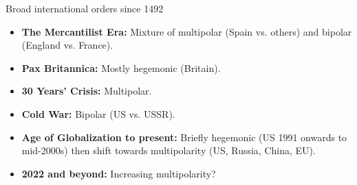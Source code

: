 \documentclass{beamer}
\begin{document}
\begin{frame}{\LARGE Broad international orders since 1492}
	\begin{itemize}
		\item \textbf{The Mercantilist Era:} \pause Mixture of multipolar (Spain vs. others) and bipolar (England vs. France). \pause
		\item \textbf{Pax Britannica:} \pause Mostly hegemonic (Britain). \pause
		\item \textbf{30 Years' Crisis:} \pause Multipolar.
		\item \textbf{Cold War:} \pause Bipolar (US vs. USSR). \pause
		\item \textbf{Age of Globalization to present:} \pause Briefly hegemonic (US 1991 onwards to mid-2000s) then shift towards multipolarity (US, Russia, China, EU).
		\item \textbf{2022 and beyond:} \pause Increasing multipolarity? 
	\end{itemize}
\end{frame}
\end{document}
